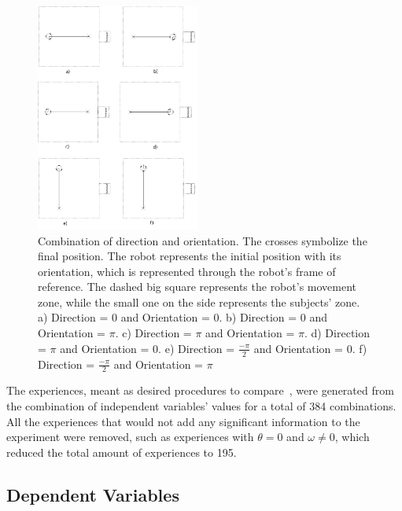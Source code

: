 \begin{figure}
	\centering
	\includegraphics[width=0.48\textwidth]{./Images/possibilities_case.png} 
	\caption{Combination of direction and orientation. The crosses symbolize the final position. The robot represents the initial position with its orientation, which is represented through the robot's frame of reference. The dashed big square represents the robot's movement zone, while the small one on the side represents the subjects' zone. a) Direction = $0$ and Orientation = $0$. b) Direction = $0$ and Orientation = $\pi$. c) Direction = $\pi$ and Orientation = $\pi$. d) Direction = $\pi$ and Orientation = $0$. e) Direction = $\frac{-\pi}{2}$ and Orientation = $0$. f) Direction = $\frac{-\pi}{2}$ and Orientation = $\pi$}
	\label{fig:possibilities_orientation_direction}
\end{figure}

The experiences, meant as desired procedures to compare~\cite{oehlert2000first}, %
were generated from the combination of independent variables' values for a total of 384 combinations. All the experiences that would not add any significant information to the experiment were removed, such as experiences with $\theta=0$ and $\omega \neq 0$, which reduced the total amount of experiences to 195.

\subsection{Dependent Variables}

